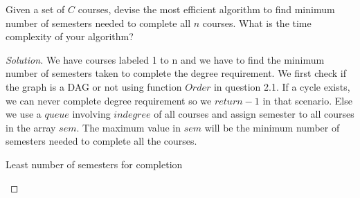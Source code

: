 \begin{solution}{2.2}
    \begin{question}
        Given a set of $C$ courses, devise the most efficient algorithm to find minimum number of semesters needed to complete all $n$ courses. What is the time complexity of your algorithm? 
    \end{question}
    \tcblower{}
    \begin{proof}[Solution]
        We have courses labeled 1 to n and we have to find the minimum number of semesters taken to complete the degree requirement. We first check if the graph is a DAG or not using function $Order$ in question 2.1. If a cycle exists, we can never complete degree requirement so we $return -1$ in that scenario. Else we use a $queue$ involving $indegree$ of all courses and assign semester to all courses in the array $sem$. The maximum value in $sem$ will be the minimum number of semesters needed to complete all the courses. 
        
        \begin{algorithm}[H]
        \caption{Least number of semesters for completion}
        \begin{algorithmic}
         
        \EndIf{}
         
         
            \EndFor{}
        \EndFor{}
        
          
            \EndIf{}
        \EndFor{}
        

\end{algorithmic}
\end{algorithm}
\end{proof}
\end{solution}
